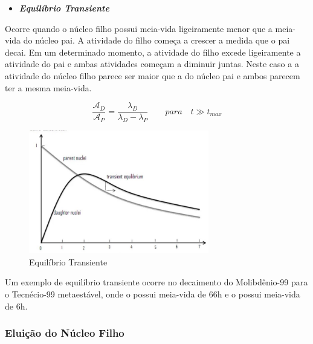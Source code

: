 \documentclass[11pt,a4paper]{article}
\newcounter{exemplo}
\begin{document}
                \begin{itemize}
                    \item \textbf{\textit{\textcolor{CarnationPink}{Equilíbrio Transiente}}}
                \end{itemize}

                    Ocorre quando o núcleo filho possui meia-vida ligeiramente menor que a meia-vida do núcleo pai. A atividade do filho começa a crescer a medida que o pai decai. Em um determinado momento, a atividade do filho excede ligeiramente a atividade do pai e ambas atividades começam a diminuir juntas. Neste caso a  a atividade do núcleo filho parece ser maior que a do núcleo pai e ambos parecem ter a mesma meia-vida.
                    
                    \begin{equation}
                        \frac{\mathcal{A}_D}{\mathcal{A}_P} = \frac{\lambda_D}{\lambda_D - \lambda_P} \qquad para \quad t \gg t_{max}
                    \end{equation}
                
                    \begin{figure}[h]
                        \centering
                        \includegraphics[width=0.7\textwidth]{Imagens/graficoEquilibrioTransiente.jpg}
                        \caption{Equilíbrio Transiente}
                        \label{fig:graficoEquilibrioTransiente}
                    \end{figure}

                    Um exemplo de equilíbrio transiente ocorre no decaimento do Molibdênio-99 para o Tecnécio-99 metaestável, onde o  possui meia-vida de 66h e o  possui meia-vida de 6h.
                
            \subsubsection{Eluição do Núcleo Filho}
\end{document}
